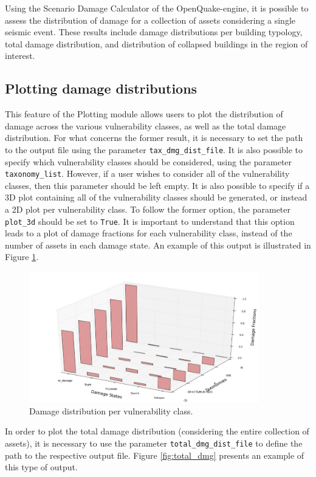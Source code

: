 Using the Scenario Damage Calculator \citep{SilvaEtAl2014a} of the OpenQuake-engine, it is possible to assess the distribution of damage for a collection of assets considering a single seismic event. These results include damage distributions per building typology, total damage distribution, and distribution of collapsed buildings in the region of interest.

\subsection{Plotting damage distributions}
\label{subsec:plot-damage_disag}
This feature of the Plotting module allows users to plot the distribution of damage across the various vulnerability classes, as well as the total damage distribution. For what concerns the former result, it is necessary to set the path to the output file using the parameter \verb=tax_dmg_dist_file=. It is also possible to specify which vulnerability classes should be considered, using the parameter \verb=taxonomy_list=. However, if a user wishes to consider all of the vulnerability classes, then this parameter should be left empty. It is also possible to specify if a 3D plot containing all of the vulnerability classes should be generated, or instead a 2D plot per vulnerability class. To follow the former option, the parameter \verb=plot_3d= should be set to \verb=True=. It is important to understand that this option leads to a plot of damage fractions for each vulnerability class, instead of the number of assets in each damage state. An example of this output is illustrated in Figure \ref{fig:damage_disag}.

\begin{figure}[htb]
  \centering
      \includegraphics[width=10cm]{figures/damage_distribution.png}
  \caption{Damage distribution per vulnerability class.}
  \label{fig:damage_disag}
\end{figure}

In order to plot the total damage distribution (considering the entire collection of assets), it is necessary to use the parameter \verb=total_dmg_dist_file= to define the path to the respective output file. Figure \ref{fig:total_dmg} presents an example of this type of output.

